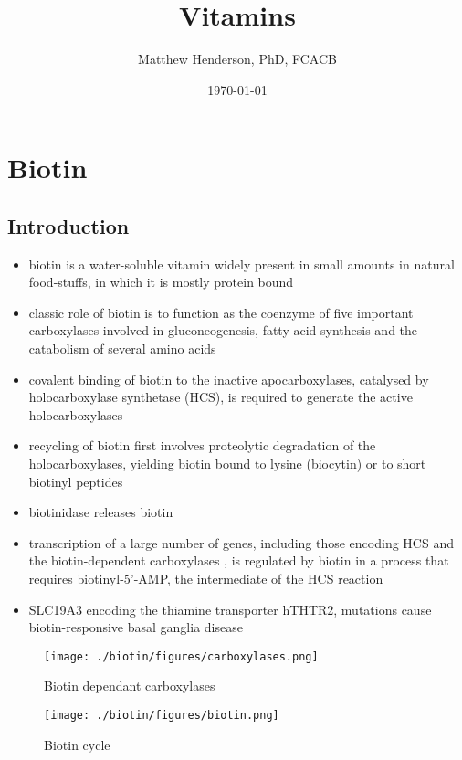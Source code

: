 \documentclass{scrartcl}
\author{Matthew Henderson, PhD, FCACB}
\date{\today}
\title{Vitamins}
\begin{document}
\maketitle
\setcounter{tocdepth}{2}
\tableofcontents


\section{Biotin}
\label{sec:orge406aa9}
\subsection{Introduction}
\label{sec:org12f7811}
\begin{itemize}
\item biotin is a water-soluble vitamin widely present in small amounts in
natural food-stuffs, in which it is mostly protein bound
\item classic role of biotin is to function as the coenzyme of five
important carboxylases involved in gluconeogenesis, fatty acid
synthesis and the catabolism of several amino acids
\item covalent binding of biotin to the inactive apocarboxylases,
catalysed by holocarboxylase synthetase (HCS), is required to
generate the active holocarboxylases
\item recycling of biotin first involves proteolytic degradation of the
holocarboxylases, yielding biotin bound to lysine (biocytin) or to
short biotinyl peptides
\item biotinidase releases biotin
\item transcription of a large number of genes, including those encoding
HCS and the biotin-dependent carboxylases , is regulated by biotin
in a process that requires biotinyl-5’-AMP, the intermediate of the
HCS reaction
\item SLC19A3 encoding the thiamine transporter hTHTR2, mutations cause
biotin-responsive basal ganglia disease
\end{itemize}

\begin{figure}[htbp]
\centering
\texttt{[image: ./biotin/figures/carboxylases.png]}
\caption{\label{fig:org681a2fb}
Biotin dependant carboxylases}
\end{figure}


\begin{figure}[htbp]
\centering
\texttt{[image: ./biotin/figures/biotin.png]}
\caption{\label{fig:orgdebc850}
Biotin cycle}
\end{figure}
\end{document}
